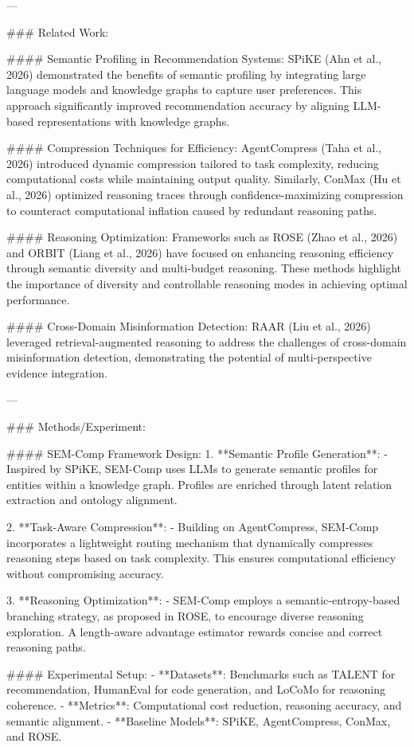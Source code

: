 ---

### Related Work:

#### Semantic Profiling in Recommendation Systems:
SPiKE (Ahn et al., 2026) demonstrated the benefits of semantic profiling by integrating large language models and knowledge graphs to capture user preferences. This approach significantly improved recommendation accuracy by aligning LLM-based representations with knowledge graphs.

#### Compression Techniques for Efficiency:
AgentCompress (Taha et al., 2026) introduced dynamic compression tailored to task complexity, reducing computational costs while maintaining output quality. Similarly, ConMax (Hu et al., 2026) optimized reasoning traces through confidence-maximizing compression to counteract computational inflation caused by redundant reasoning paths.

#### Reasoning Optimization:
Frameworks such as ROSE (Zhao et al., 2026) and ORBIT (Liang et al., 2026) have focused on enhancing reasoning efficiency through semantic diversity and multi-budget reasoning. These methods highlight the importance of diversity and controllable reasoning modes in achieving optimal performance.

#### Cross-Domain Misinformation Detection:
RAAR (Liu et al., 2026) leveraged retrieval-augmented reasoning to address the challenges of cross-domain misinformation detection, demonstrating the potential of multi-perspective evidence integration.

---

### Methods/Experiment:

#### SEM-Comp Framework Design:
1. **Semantic Profile Generation**:
   - Inspired by SPiKE, SEM-Comp uses LLMs to generate semantic profiles for entities within a knowledge graph. Profiles are enriched through latent relation extraction and ontology alignment.

2. **Task-Aware Compression**:
   - Building on AgentCompress, SEM-Comp incorporates a lightweight routing mechanism that dynamically compresses reasoning steps based on task complexity. This ensures computational efficiency without compromising accuracy.

3. **Reasoning Optimization**:
   - SEM-Comp employs a semantic-entropy-based branching strategy, as proposed in ROSE, to encourage diverse reasoning exploration. A length-aware advantage estimator rewards concise and correct reasoning paths.

#### Experimental Setup:
- **Datasets**: Benchmarks such as TALENT for recommendation, HumanEval for code generation, and LoCoMo for reasoning coherence.
- **Metrics**: Computational cost reduction, reasoning accuracy, and semantic alignment.
- **Baseline Models**: SPiKE, AgentCompress, ConMax, and ROSE.


